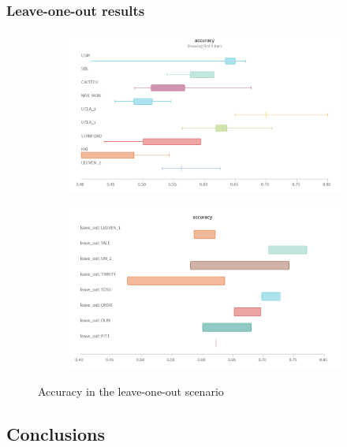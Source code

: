 	\subsubsection{Leave-one-out results}

	
	\begin{figure}[!h]
		\centering
		\begin{subfigure}[b]{0.45\textwidth}
			\centering
			\includegraphics[width=\textwidth]{figures/fkr.png}
		\end{subfigure}
		\hfill
		\begin{subfigure}[b]{0.45\textwidth}
			\centering
			\includegraphics[width=\textwidth]{figures/skr.png}
		\end{subfigure}
		\caption{Accuracy in the leave-one-out scenario}
		\label{fig:leave_out}
	\end{figure}




	
	\subsection{Conclusions}
	
	
	
	
	
	
	
	
	
	
	
	
	
	
	
	